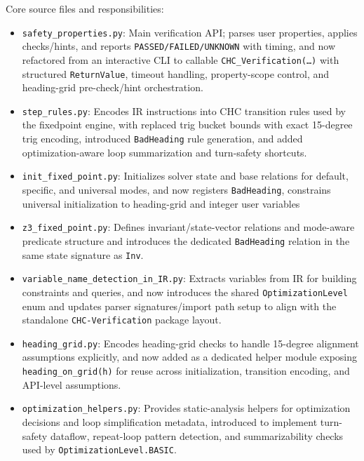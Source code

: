 \noindent
Core source files and responsibilities:
\begin{itemize}[leftmargin=1.5em]
	\item \texttt{safety\_properties.py}: Main verification API; parses user properties, applies checks/hints, and reports \texttt{PASSED/FAILED/UNKNOWN} with timing, and now refactored from an interactive CLI to callable \texttt{CHC\_Verification(\ldots)} with structured \texttt{ReturnValue}, timeout handling, property-scope control, and heading-grid pre-check/hint orchestration.
	\item \texttt{step\_rules.py}: Encodes IR instructions into CHC transition rules used by the fixedpoint engine, with replaced trig bucket bounds with exact 15-degree trig encoding, introduced \texttt{BadHeading} rule generation, and added optimization-aware loop summarization and turn-safety shortcuts.
	\item \texttt{init\_fixed\_point.py}: Initializes solver state and base relations for default, specific, and universal modes, and now registers \texttt{BadHeading}, constrains universal initialization to heading-grid and integer user variables
	\item \texttt{z3\_fixed\_point.py}: Defines invariant/state-vector relations and mode-aware predicate structure and introduces the dedicated \texttt{BadHeading} relation in the same state signature as \texttt{Inv}.
	\item \texttt{variable\_name\_detection\_in\_IR.py}: Extracts variables from IR for building constraints and queries, and now introduces the shared \texttt{OptimizationLevel} enum and updates parser signatures/import path setup to align with the standalone \texttt{CHC-Verification} package layout.
	\item \texttt{heading\_grid.py}: Encodes heading-grid checks to handle 15-degree alignment assumptions explicitly, and now added as a dedicated helper module exposing \texttt{heading\_on\_grid(h)} for reuse across initialization, transition encoding, and API-level assumptions.
	\item \texttt{optimization\_helpers.py}: Provides static-analysis helpers for optimization decisions and loop simplification metadata, introduced to implement turn-safety dataflow, repeat-loop pattern detection, and summarizability checks used by \texttt{OptimizationLevel.BASIC}.
\end{itemize}

\noindent
